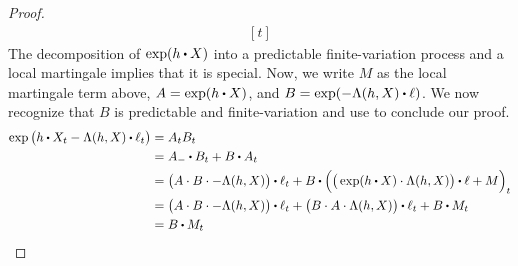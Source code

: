 \begin{proof}
\begin{equation*}
\begin{aligned}[t]
    \end{aligned} 
  \end{equation*}
  The decomposition of $\exp(\twistFunc \shortInt \X)$ into a predictable finite-variation process and a  local martingale implies that it is special.
  Now, we write $M$ as the local martingale term above, $A = \exp(\twistFunc \shortInt \X)$, and $B = \exp(-\ode(\twistFunc, \X) \shortInt \leb)$.
  We now recognize that $B$ is predictable and finite-variation and use \cite[Proposition I.4.49(b)]{jacod2003} to conclude our proof.
  \begin{align*}
    \exp\big( \twistFunc \shortInt \X_t - \ode(\twistFunc, \X) \shortInt \leb_t \big) 
    &= A_t B_t \\
    &= A_- \shortInt B_t + B \shortInt A_t \\
    &= \big( A \cdot B \cdot -\ode(\twistFunc, \X) \big) \shortInt \leb_t + B \shortInt \Big( \big( \exp( \twistFunc \shortInt \X ) \cdot \ode(\twistFunc, \X) \big) \shortInt \leb + M \Big)_t \\
    &= \big( A \cdot B \cdot -\ode(\twistFunc, \X) \big) \shortInt \leb_t + \big( B \cdot A \cdot \ode(\twistFunc, \X) \big) \shortInt \leb_t + B \shortInt M_t \\
    &= B \shortInt M_t
  \end{align*}
\end{proof}
